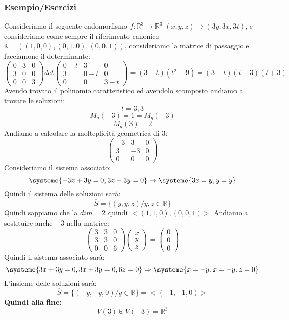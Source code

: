\subsubsection{Esempio/Esercizi}
Consideriamo il seguente endomorfismo $f: \mathbb{R}^3 \rightarrow \mathbb{R}^3$ $(x,y,z) \rightarrow (3y,3x,3t)$, e consideriamo come sempre il riferimento canonico $\mathtt{R}=((1,0,0),(0,1,0),(0,0,1))$, consideriamo la matrice di passaggio e facciamone il determinante:
$$
\begin{pmatrix}
0 & 3 & 0 \\ 3 & 0 & 0 \\ 0 & 0 & 3
\end{pmatrix} 
det \begin{pmatrix}
0-t & 3 & 0 \\ 3 & 0-t & 0 \\ 0 & 0 & 3-t
\end{pmatrix} 
=(3-t)(t^2-9)= (3-t)(t-3)(t+3)
$$
Avendo trovato il polinomio caratteristico ed avendolo scomposto andiamo a trovare le soluzioni:
$$ t=3,3 $$
$$ M_a(-3) = 1 = M_g(-3)$$
$$ M_a(3) = 2$$
Andiamo a calcolare la molteplicità geometrica di $3$:
$$
\begin{pmatrix}
-3 & 3 & 0 \\ 3 & -3 & 0 \\ 0 & 0 & 0
\end{pmatrix}
$$
Consideriamo il sistema associato:
$$ 
\systeme{-3x+3y=0, 3x-3y=0} \rightarrow \systeme{3x=y,y=y}
$$
Quindi il sistema delle soluzioni sarà:
$$
\overline{S} = \{(y,y,z)/y,z \in \mathbb{R}\}
$$
Quindi sappiamo che la $dim=2$ quindi $<(1,1,0),(0,0,1)>$
Andiamo a sostituire anche $-3$ nella matrice:
$$ 
\begin{pmatrix}
3 & 3 & 0  \\ 3 & 3 & 0 \\ 0 & 0 & 6
\end{pmatrix}
\begin{pmatrix}
x \\ y \\ z
\end{pmatrix}
=
\begin{pmatrix}
0 \\ 0 \\ 0
\end{pmatrix}
$$
Quindi il sistema associato sarà:
$$ 
\systeme{3x+3y = 0, 3x+3y=0, 6z=0} \Rightarrow \systeme{x=-y,x=-y, z=0}
$$
L'insieme delle soluzioni sarà:
$$ 
\overline{S}=\{(-y,-y,0)/ y \in \mathbb{R} \} = <(-1,-1,0)>
$$
\textbf{Quindi alla fine:}
$$ V(3) \uplus V(-3) = \mathbb{R}^3 $$

